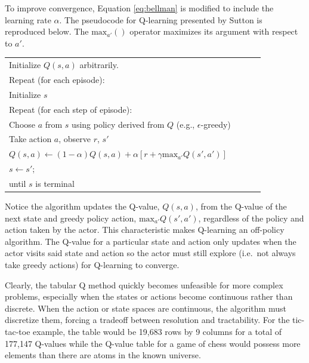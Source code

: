 To improve convergence, Equation \ref{eq:bellman} is modified to include the learning rate $\alpha$. The pseudocode for Q-learning presented by Sutton is reproduced below. The $\text{max}_{a'}()$ operator maximizes its argument with respect to $a'$.
\begin{center} \begin{tabular}{|p{0.9\linewidth}|}\hline %
Initialize $Q(s,a)$ arbitrarily. \\
Repeat (for each episode): \\
\qquad Initialize $s$\\
\qquad Repeat (for each step of episode):\\
\qquad \qquad Choose $a$ from $s$ using policy derived from $Q$ (e.g., $\epsilon$-greedy)\\
\qquad \qquad Take action $a$, observe $r$, $s'$\\
\qquad \qquad $Q(s,a)\gets (1-\alpha)Q(s,a) + \alpha [r + \gamma \text{max}_{a'}Q(s',a')]$\\
\qquad \qquad $s \gets s';$\\
\qquad until $s$ is terminal \\
\hline
\end{tabular} \end{center}

Notice the algorithm updates the Q-value, $Q(s,a)$, from the Q-value of the next state and greedy policy action, $\text{max}_{a'}Q(s',a')$, regardless of the policy and action taken by the actor. This characteristic makes Q-learning an off-policy algorithm. The Q-value for a particular state and action only updates when the actor visits said state and action so the actor must still explore (i.e.\ not always take greedy actions) for Q-learning to converge.

Clearly, the tabular Q method quickly becomes unfeasible for more complex problems, especially when the states or actions become continuous rather than discrete. When the action or state spaces are continuous, the algorithm must discretize them, forcing a tradeoff between resolution and tractability. For the tic-tac-toe example, the table would be 19,683 rows by 9 columns for a total of 177,147 Q-values while the Q-value table for a game of chess would possess more elements than there are atoms in the known universe.


